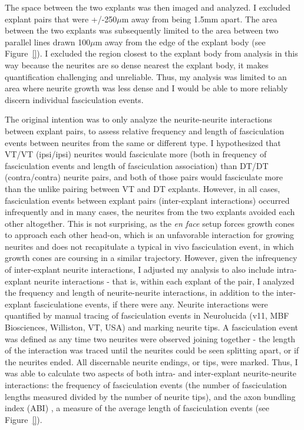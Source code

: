 The space between the two explants was then imaged and analyzed.
I excluded explant pairs that were +/-250$\mu$m away from being 1.5mm apart.
The area between the two explants was subsequently limited to the area between two parallel lines drawn 100$\mu$m away from the edge of the explant body (see Figure~\ref{}).
I excluded the region closest to the explant body from analysis in this way because the neurites are so dense nearest the explant body, it makes quantification challenging and unreliable.
Thus, my analysis was limited to an area where neurite growth was less dense and I would be able to more reliably discern individual fasciculation events.

The original intention was to only analyze the neurite-neurite interactions between explant pairs, to assess relative frequency and length of fasciculation events between neurites from the same or different type.
I hypothesized that VT/VT (ipsi/ipsi) neurites would fasciculate more (both in frequency of fasciculation events and length of fasciculation association) than DT/DT (contra/contra) neurite pairs, and both of those pairs would fasciculate more than the unlike pairing between VT and DT explants.
However, in all cases, fasciculation events between explant pairs (inter-explant interactions) occurred infrequently and in many cases, the neurites from the two explants avoided each other altogether.
This is not surprising, as the \emph{en face} setup forces growth cones to approach each other head-on, which is an unfavorable interaction for growing neurites and does not recapitulate a typical in vivo fasciculation event, in which growth cones are coursing in a similar trajectory.
However, given the infrequency of inter-explant neurite interactions, I adjusted my analysis to also include intra-explant neurite interactions - that is, within each explant of the pair, I analyzed the frequency and length of neurite-neurite interactions, in addition to the inter-explant fasciculatione events, if there were any.
Neurite interactions were quantified by manual tracing of fasciculation events in Neurolucida (v11, MBF Biosciences, Williston, VT, USA) and marking neurite tips.
A fasciculation event was defined as any time two neurites were observed joining together - the length of the interaction was traced until the neurites could be seen splitting apart, or if the neurites ended.
All discernable neurite endings, or tips, were marked.
Thus, I was able to calculate two aspects of both intra- and inter-explant neurite-neurite interactions: the frequency of fasciculation events (the number of fasciculation lengths measured divided by the number of neurite tips), and the axon bundling index (ABI) \cite[after][]{barry2010polarized}, a measure of the average length of fasciculation events (see Figure~\ref{}).

